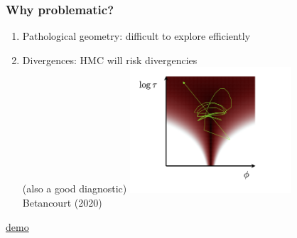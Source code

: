 \documentclass[10pt]{beamer}
\begin{document}
\begin{frame}
\frametitle{Why problematic?}

  \begin{enumerate}
  \item Pathological geometry: difficult to explore efficiently %

  \item Divergences: HMC will risk divergencies \\(also a good diagnostic)
\center
  {\includegraphics[width=6cm]{figs/diver.png}}\\
  \tiny{Betancourt (2020)}
  \end{enumerate}
    \centering
\href{https://chi-feng.github.io/mcmc-demo/app.html?algorithm=HamiltonianMC&target=funnel}{demo}

\end{frame}
\end{document}

